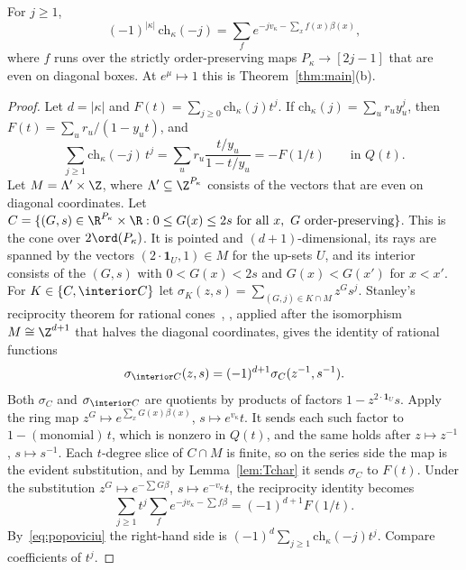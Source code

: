 \begin{proposition}\label{prop:strictchar}
For $j\ge1$,
\[ (-1)^{|\kappa|}\,\mathrm{ch}_\kappa(-j)=\sum_f e^{-jv_\kappa-\sum_xf(x)\beta(x)}, \]
where $f$ runs over the strictly order-preserving maps $P_\kappa\to[2j-1]$ that are even on
diagonal boxes. At $e^\mu\mapsto1$ this is Theorem~\ref{thm:main}(b).
\end{proposition}

\begin{proof}
Let $d=|\kappa|$ and $F(t)=\sum_{j\ge0}\mathrm{ch}_\kappa(j)t^j$. If
$\mathrm{ch}_\kappa(j)=\sum_ur_uy_u^j$, then $F(t)=\sum_ur_u/(1-y_ut)$, and
\begin{equation}\label{eq:popoviciu}
\sum_{j\ge1}\mathrm{ch}_\kappa(-j)\,t^j=\sum_ur_u\frac{t/y_u}{1-t/y_u}=-F(1/t)\qquad\text{in }Q(t).
\end{equation}
Let $M=\Lambda'\times\Z$, where $\Lambda'\subseteq\Z^{P_\kappa}$ consists of the vectors that are even
on diagonal coordinates. Let
$C=\{(G,s)\in\R^{P_\kappa}\times\R:0\le G(x)\le2s\text{ for all }x,\ G\text{ order-preserving}\}$.
This is the cone over $2\ord(P_\kappa)$. It is pointed and $(d+1)$-dimensional, its rays are
spanned by the vectors $(2\cdot\mathbf 1_U,1)\in M$ for the up-sets $U$, and its interior consists of
the $(G,s)$ with $0<G(x)<2s$ and $G(x)<G(x')$ for $x<x'$. For $K\in\{C,\interior C\}$ let
$\sigma_K(z,s)=\sum_{(G,j)\in K\cap M}z^Gs^j$. Stanley's reciprocity theorem for rational
cones~\cite{Stanley74}, \cite[Ch.~4]{BeckRobins}, applied after the isomorphism $M\cong\Z^{d+1}$ that halves
the diagonal coordinates, gives the identity of rational functions
\[ \sigma_{\interior C}(z,s)=(-1)^{d+1}\sigma_C(z^{-1},s^{-1}). \]
Both $\sigma_C$ and $\sigma_{\interior C}$ are quotients by products of factors
$1-z^{2\cdot\mathbf 1_U}s$. Apply the ring map $z^G\mapsto e^{\sum_xG(x)\beta(x)}$,
$s\mapsto e^{v_\kappa}t$. It sends each such factor to $1-(\text{monomial})\,t$, which is nonzero in
$Q(t)$, and the same holds after $z\mapsto z^{-1}$, $s\mapsto s^{-1}$. Each $t$-degree slice of
$C\cap M$ is finite, so on the series side the map is the evident substitution, and by
Lemma~\ref{lem:Tchar} it sends $\sigma_C$ to $F(t)$. Under the substitution
$z^G\mapsto e^{-\sum G\beta}$, $s\mapsto e^{-v_\kappa}t$, the reciprocity identity becomes
\[ \sum_{j\ge1}t^j\sum_fe^{-jv_\kappa-\sum f\beta}=(-1)^{d+1}F(1/t). \]
By~\eqref{eq:popoviciu} the right-hand side is $(-1)^d\sum_{j\ge1}\mathrm{ch}_\kappa(-j)t^j$. Compare
coefficients of $t^j$.
\end{proof}


